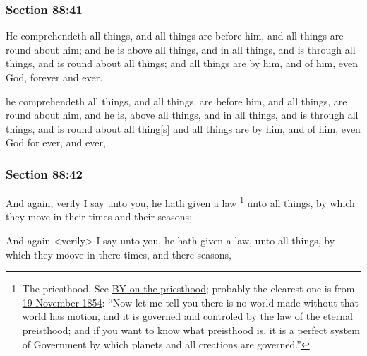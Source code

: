 	\subsubsection{Section 88:41} %
		\label{DC88-41}

		He comprehendeth all things, and all things are before him, and all things are round about him; and he is above all things, and in all things, and is through all things, and is round about all things; and all things are by him, and of him, even God, forever and ever.

		\begin{framed}
		\scriptsize
			\begin{compactdesc}
				\item[JSP] he comprehendeth all things, and all things, are before him, and all things, are round about him, and he is, above all things, and in all things, and is through all things, and is round about all thing[s] and all things are by him, and of him, even God for ever, and ever,
			\end{compactdesc}
		\end{framed}

	\subsubsection{Section 88:42} %
		\label{DC88-42}

		And again, verily I say unto you, he hath given a law%
			\footnote{%
				The priesthood. See \hyperref[PRIESTHOOD-BY]{BY on the priesthood}; probably the clearest one is from \hyperref[EMS-1854-BY-19-NOV-1854]{19 November 1854}: ``Now let me tell you there is no world made without that world has motion, and it is governed and controled by the law of the eternal preisthood; and if you want to know what preisthood is, it is a perfect system of Government by which planets and all creations are governed.''
				}
		unto all things, by which they move in their times and their seasons;

		\begin{framed}
		\scriptsize
			\begin{compactdesc}
				\item[JSP] And again <verily> I say unto you, he hath given a law, unto all things, by which they moove in there times, and there seasons,
			\end{compactdesc}
		\end{framed}

